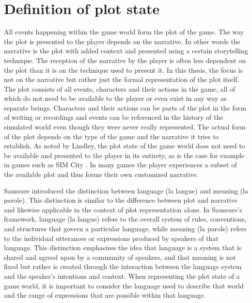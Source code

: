 
\section{Definition of plot state}

All events happening within the game world form the plot of the game.
The way the plot is presented to the player depends on the narrative.
In other words the narrative is the plot with added context and presented using a certain storytelling technique.
The reception of the narrative by the player is often less dependent on the plot than it is on the technique used to present it.
In this thesis, the focus is not on the narrative but rather just the formal representation of the plot itself.
The plot consists of all events, characters and their actions in the game, all of which do not need to be available to the player or even exist in any way as separate beings.
Characters and their actions can be parts of the plot in the form of writing or recordings and events can be referenced in the history of the simulated world even though they were never really represented.
The actual form of the plot depends on the type of the game and the narrative it tries to establish.
As noted by Lindley, the plot state of the game world does not need to be available and presented to the player in its entirety, as is the case for example in games such as SIM City \cite{lindley2005story}.
In many games the player experiences a subset of the available plot and thus forms their own customized narrative.

Saussure introduced the distinction between language (la langue) and meaning (la parole)\cite{gordon2004langue}.
This distinction is similar to the difference between plot and narrative and likewise applicable in the context of plot representation alone.
In Saussure's framework, language (la langue) refers to the overall system of rules, conventions, and structures that govern a particular language, while meaning (la parole) refers to the individual utterances or expressions produced by speakers of that language.
This distinction emphasizes the idea that language is a system that is shared and agreed upon by a community of speakers, and that meaning is not fixed but rather is created through the interaction between the language system and the speaker's intentions and context.
When representing the plot state of a game world, it is important to consider the language used to describe that world and the range of expressions that are possible within that language.

